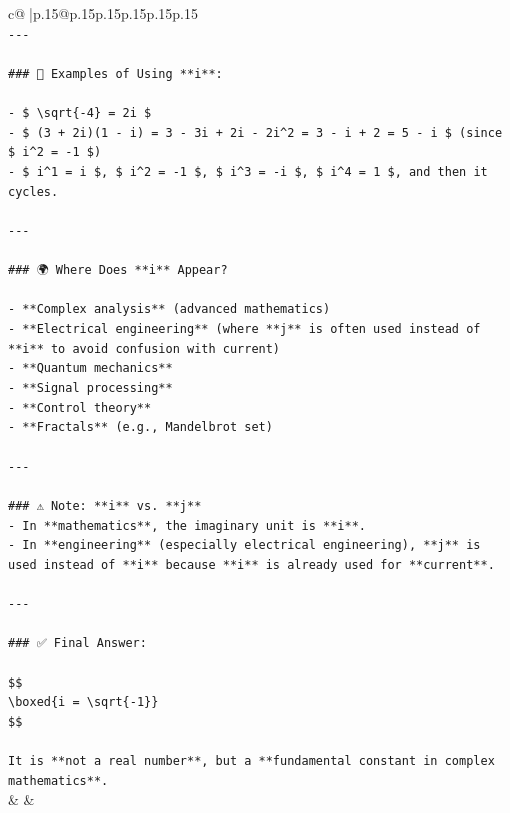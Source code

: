 \documentclass{article}
\begin{document}
{\begin{supertabular}{c@{$\;$}|p{.15\linewidth}@{}p{.15\linewidth}p{.15\linewidth}p{.15\linewidth}p{.15\linewidth}p{.15\linewidth}}
{{{\\ 
\texttt{{-}{-}{-}} \\
\\ 
\texttt{\#\#\# 🧮 Examples of Using **i**:} \\
\\ 
\texttt{{-} \$ \textbackslash{}sqrt\{{-}4\} = 2i \$} \\
\texttt{{-} \$ (3 + 2i)(1 {-} i) = 3 {-} 3i + 2i {-} 2i\^{}2 = 3 {-} i + 2 = 5 {-} i \$ (since \$ i\^{}2 = {-}1 \$)} \\
\texttt{{-} \$ i\^{}1 = i \$, \$ i\^{}2 = {-}1 \$, \$ i\^{}3 = {-}i \$, \$ i\^{}4 = 1 \$, and then it cycles.} \\
\\ 
\texttt{{-}{-}{-}} \\
\\ 
\texttt{\#\#\# 🌍 Where Does **i** Appear?} \\
\\ 
\texttt{{-} **Complex analysis** (advanced mathematics)} \\
\texttt{{-} **Electrical engineering** (where **j** is often used instead of **i** to avoid confusion with current)} \\
\texttt{{-} **Quantum mechanics**} \\
\texttt{{-} **Signal processing**} \\
\texttt{{-} **Control theory**} \\
\texttt{{-} **Fractals** (e.g., Mandelbrot set)} \\
\\ 
\texttt{{-}{-}{-}} \\
\\ 
\texttt{\#\#\# ⚠️ Note: **i** vs. **j**} \\
\texttt{{-} In **mathematics**, the imaginary unit is **i**.} \\
\texttt{{-} In **engineering** (especially electrical engineering), **j** is used instead of **i** because **i** is already used for **current**.} \\
\\ 
\texttt{{-}{-}{-}} \\
\\ 
\texttt{\#\#\# ✅ Final Answer:} \\
\\ 
\texttt{\$\$} \\
\texttt{\textbackslash{}boxed\{i = \textbackslash{}sqrt\{{-}1\}\}} \\
\texttt{\$\$} \\
\\ 
\texttt{It is **not a real number**, but a **fundamental constant in complex mathematics**.} \\
            }
        }
    }
    & & \\ \\


\end{supertabular}}
\end{document}
